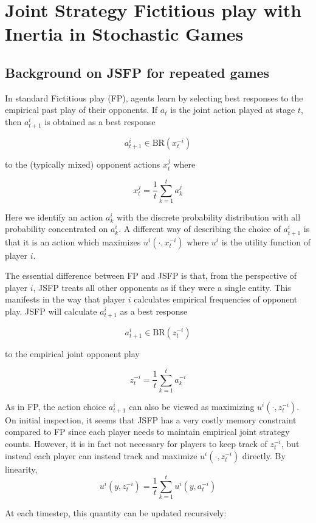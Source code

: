 
\section{Joint Strategy Fictitious play with Inertia in Stochastic Games}


\subsection{Background on JSFP for repeated games}


In standard Fictitious play (FP), agents learn by selecting best responses to the empirical past play of their opponents. If $a_t$ is the joint action played at stage $t$, then $a_{t+1}^i$ is obtained as a best response

$$
a_{t+1}^i \in \mathrm{BR}(x_t^{-i})
$$


to the (typically mixed) opponent actions $x_t^j$ where 

$$
x_t^j = \frac{1}{t} \sum_{k=1}^t a_k^j
$$

Here we identify an action $a_k^i$ with the discrete probability distribution with all probability concentrated on $a_k^i$. A different way of describing the choice of $a_{t+1}^i$ is that it is an action which maximizes $u^i(\cdot, x_t^{-i})$ where $u^i$ is the utility function of player $i$.



The essential difference between FP and JSFP is that, from the perspective of player $i$, JSFP treats all other opponents as if they were a single entity. This manifests in the way that player $i$ calculates empirical frequencies of opponent play. JSFP will calculate $a_{t+1}^i$ as a best response

$$
a_{t+1}^i \in \mathrm{BR}(z_t^{-i})
$$

to the empirical joint opponent play

$$
z_t^{-i} = \frac{1}{t} \sum_{k=1}^t a_{k}^{-i}
$$

As in FP, the action choice $a_{t+1}^i$ can also be viewed as maximizing $u^i(\cdot, z_t^{-i})$. On initial inspection, it seems that JSFP has a very costly memory constraint compared to FP since each player needs to maintain empirical joint strategy counts. However, it is in fact not necessary for players to keep track of $z_t^{-i}$, but instead each player can instead track and maximize $u^i(\cdot, z_t^{-i})$ directly. By linearity,
$$
u^i(y, z^{-i}_t) = \frac{1}{t} \sum_{k=1}^t u^i(y, a^{-i}_t)
$$ 

At each timestep, this quantity can be updated recursively:

